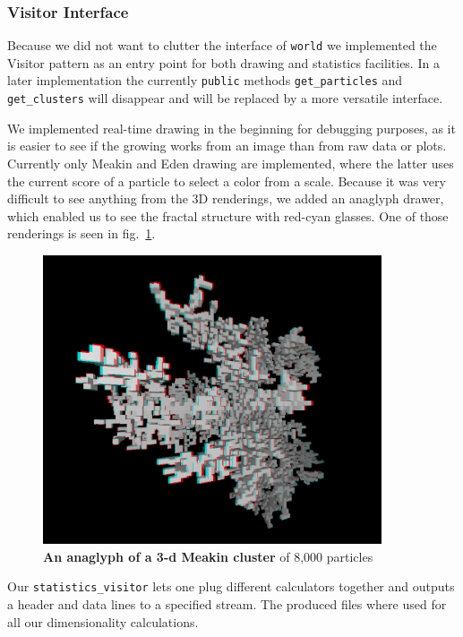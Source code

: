 \documentclass[twocolumn, 10pt]{scrartcl}
\begin{document}
            \subsubsection{Visitor Interface}
                Because we did not want to clutter the interface of \lstinline'world' we implemented the Visitor
                pattern\cite{src-visitor} as an entry point for both drawing and statistics facilities. In a later
                implementation the currently \lstinline'public' methods \lstinline'get_particles' and
                \lstinline'get_clusters' will disappear and will be replaced by a more versatile interface.

                We implemented real-time drawing in the beginning for debugging purposes, as it is easier to see if the
                growing works from an image than from raw data or plots. Currently only Meakin and Eden drawing are
                implemented, where the latter uses the current score of a particle to select a color from a scale.
                Because it was very difficult to see anything from the 3D renderings, we added an anaglyph drawer, which
                enabled us to see the fractal structure with red-cyan glasses. One of those renderings is seen in
                fig.~\ref{fig-anaglyph}.
                \begin{figure}
                    \center
                    \includegraphics[width=10cm]{img/anaglyph.png}
                    \caption[An anaglyph of a 3-d Meakin cluster]
                        {\small\textbf{An anaglyph of a 3-d Meakin cluster} of 8,000 particles}
                    \label{fig-anaglyph}
                \end{figure}

                Our \lstinline'statistics_visitor' lets one plug different calculators together and outputs a header and
                data lines to a specified stream. The produced files where used for all our dimensionality calculations.
\end{document}
